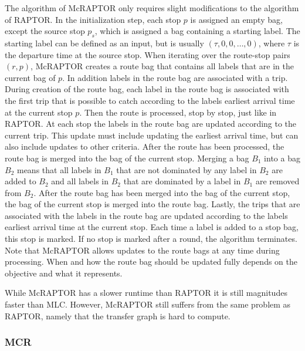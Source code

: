 The algorithm of McRAPTOR only requires slight modifications to the algorithm of RAPTOR.
In the initialization step, each stop \(p\) is assigned an empty bag, except the source stop \(p_s\), which is assigned a bag containing a starting label.
The starting label can be defined as an input, but is usually \((\tau, 0, 0, \dots, 0)\), where \(\tau\) is the departure time at the source stop.
When iterating over the route-stop pairs \((r, p)\), McRAPTOR creates a route bag that contains all labels that are in the current bag of \(p\).
In addition labels in the route bag are associated with a trip.
During creation of the route bag, each label in the route bag is associated with the first trip that is possible to catch according to the labels earliest arrival time at the current stop \(p\).
Then the route is processed, stop by stop, just like in RAPTOR.
At each stop the labels in the route bag are updated according to the current trip.
This update must include updating the earliest arrival time, but can also include updates to other criteria.
After the route has been processed, the route bag is merged into the bag of the current stop.
Merging a bag \(B_1\) into a bag \(B_2\) means that all labels in \(B_1\) that are not dominated by any label in \(B_2\) are added to \(B_2\) and all labels in \(B_2\) that are dominated by a label in \(B_1\) are removed from \(B_2\).
After the route bag has been merged into the bag of the current stop, the bag of the current stop is merged into the route bag.
Lastly, the trips that are associated with the labels in the route bag are updated according to the labels earliest arrival time at the current stop.
Each time a label is added to a stop bag, this stop is marked.
If no stop is marked after a round, the algorithm terminates.
Note that McRAPTOR allows updates to the route bags at any time during processing.
When and how the route bag should be updated fully depends on the objective and what it represents.

While McRAPTOR has a slower runtime than RAPTOR it is still magnitudes faster than MLC.
However, McRAPTOR still suffers from the same problem as RAPTOR, namely that the transfer graph is hard to compute.


\subsubsection{MCR}
\label{subsubsec:mcr}

